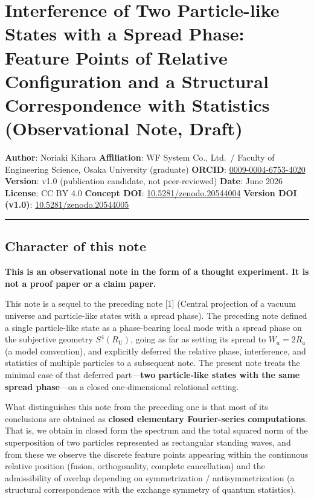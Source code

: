 \documentclass[
]{article}
\author{}
\date{}
\begin{document}
\section{Interference of Two Particle-like States with a Spread Phase:
Feature Points of Relative Configuration and a Structural Correspondence
with Statistics (Observational Note,
Draft)}\label{interference-of-two-particle-like-states-with-a-spread-phase-feature-points-of-relative-configuration-and-a-structural-correspondence-with-statistics-observational-note-draft}

\textbf{Author}: Noriaki Kihara \textbf{Affiliation}: WF System Co.,
Ltd.~/ Faculty of Engineering Science, Osaka University (graduate)
\textbf{ORCID}:
\href{https://orcid.org/0009-0004-6753-4020}{0009-0004-6753-4020}
\textbf{Version}: v1.0 (publication candidate, not peer-reviewed)
\textbf{Date}: June 2026 \textbf{License}: CC BY 4.0 \textbf{Concept
DOI}:
\href{https://doi.org/10.5281/zenodo.20544004}{10.5281/zenodo.20544004}
\textbf{Version DOI (v1.0)}:
\href{https://doi.org/10.5281/zenodo.20544005}{10.5281/zenodo.20544005}

\begin{center}\rule{0.5\linewidth}{0.5pt}\end{center}

\subsection{Character of this note}\label{character-of-this-note}

\textbf{This is an observational note in the form of a thought
experiment. It is not a proof paper or a claim paper.}

This note is a sequel to the preceding note {[}1{]} (Central projection
of a vacuum universe and particle-like states with a spread phase). The
preceding note defined a single particle-like state as a phase-bearing
local mode with a spread phase on the subjective geometry
\(S^4(R_{\mathrm U})\), going as far as setting its spread to
\(W_a=2R_a\) (a model convention), and explicitly deferred the relative
phase, interference, and statistics of multiple particles to a
subsequent note. The present note treats the minimal case of that
deferred part---\textbf{two particle-like states with the same spread
phase}---on a closed one-dimensional relational setting.

What distinguishes this note from the preceding one is that most of its
conclusions are obtained as \textbf{closed elementary Fourier-series
computations}. That is, we obtain in closed form the spectrum and the
total squared norm of the superposition of two particles represented as
rectangular standing waves, and from these we observe the discrete
feature points appearing within the continuous relative position
(fusion, orthogonality, complete cancellation) and the admissibility of
overlap depending on symmetrization / antisymmetrization (a structural
correspondence with the exchange symmetry of quantum statistics).
\end{document}
